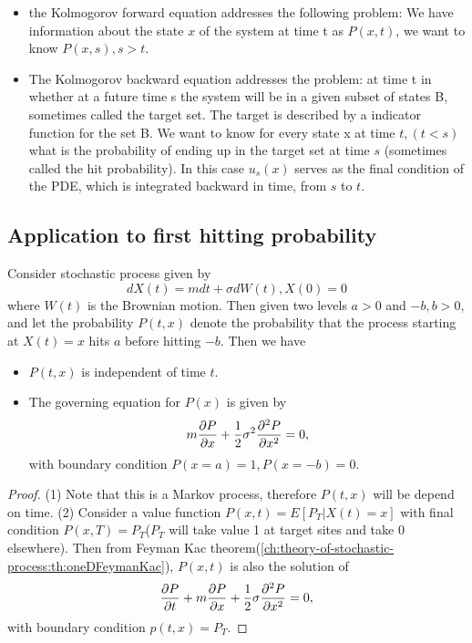 \begin{refsection}
\begin{remark}\hfill
	\begin{itemize}
		\item the Kolmogorov forward equation addresses the following problem: We have information about the state $x$ of the system at time t as $P(x,t)$, we want to know $P(x,s),s>t$. 
		\item The Kolmogorov backward equation addresses the problem: at time t in whether at a future time s the system will be in a given subset of states B, sometimes called the target set. The target is described by a  indicator function for the set B. We want to know for every state x at time $t,(t<s)$ what is the probability of ending up in the target set at time $s$ (sometimes called the hit probability). In this case $u_{s}(x)$ serves as the final condition of the PDE, which is integrated backward in time, from $s$ to $t$.
	\end{itemize}
\end{remark}




\subsection{Application to first hitting probability}
\begin{lemma}\label{ch:theory-of-stochastic-process:th:FeymanKacmethodFirsthittingprobability}
	Consider stochastic process given by 
	$$dX(t) = mdt + \sigma dW(t),X(0) = 0$$
	where $W(t)$ is the Brownian motion. Then given two levels $a>0$ and $-b,b>0$, and let the probability $P(t,x)$ denote the probability that the process starting at $X(t)=x$ hits $a$ before hitting $-b$. Then we have
	\begin{itemize}
		\item $P(t,x)$ is independent of time $t$.
		\item  The governing equation for $P(x)$ is given by
		$$m\frac{\partial P}{\partial x} + \frac{1}{2}\sigma^2 \frac{\partial^2 P}{\partial x^2} = 0,$$
		with boundary condition $P(x=a) = 1, P(x=-b) = 0$.
	\end{itemize}
\end{lemma}
\begin{proof}
	(1) Note that this is a Markov process, therefore $P(t,x)$ will be depend on time.
	(2)
	Consider a value function $P(x,t) = E[P_T|X(t) = x]$ with final condition $P(x,T) = P_T$($P_T$ will take value 1 at target sites and take 0 elsewhere). Then from Feyman Kac theorem(\autoref{ch:theory-of-stochastic-process:th:oneDFeymanKac}), $P(x,t)$ is also the solution of
	$$\frac{\partial P}{\partial t} + m\frac{\partial P}{\partial x} + \frac{1}{2}\sigma  \frac{\partial^2 P}{\partial x^2} = 0,$$
	with boundary condition $p(t,x) = P_T$. 
\end{proof}






\end{refsection}
